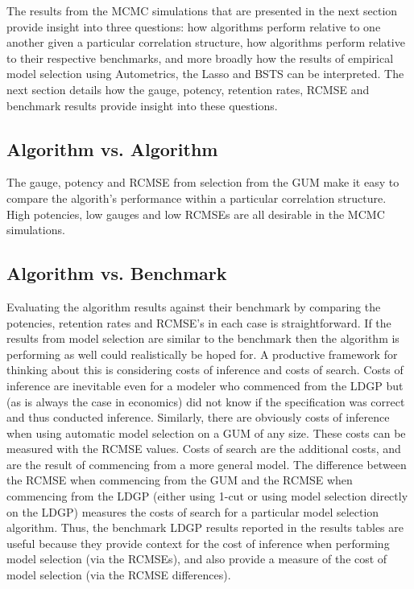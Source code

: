 \documentclass[11pt, oneside]{book}   	%
\begin{document}
The results from the MCMC simulations that are presented in the next section provide insight into three questions: how algorithms perform relative to one another given a particular correlation structure, how algorithms perform relative to their respective benchmarks, and more broadly how the results of empirical model selection using Autometrics, the Lasso and BSTS can be interpreted. The next section details how the gauge, potency, retention rates, RCMSE and benchmark results provide insight into these questions.

\subsection{Algorithm vs. Algorithm}

The gauge, potency and RCMSE from selection from the GUM make it easy to compare the algorith's performance within a particular correlation structure.  High potencies, low gauges and low RCMSEs are all desirable in the MCMC simulations. 

\subsection{Algorithm vs. Benchmark}

Evaluating the algorithm results against their benchmark by comparing the potencies, retention rates and RCMSE's in each case is straightforward. If the results from model selection are similar to the benchmark then the algorithm is performing as well could realistically be hoped for. A productive framework for thinking about this is considering costs of inference and costs of search. Costs of inference are inevitable even for a modeler who commenced from the LDGP but (as is always the case in economics) did not know if the specification was correct and thus conducted inference. Similarly, there are obviously costs of inference when using automatic model selection on a GUM of any size. These costs can be measured with the RCMSE values. Costs of search are the additional costs, and are the result of commencing from a more general model. The difference between the RCMSE when commencing from the GUM and the RCMSE when commencing from the LDGP (either using 1-cut or using model selection directly on the LDGP) measures the costs of search for a particular model selection algorithm. Thus, the benchmark LDGP results reported in the results tables are useful because they provide context for the cost of inference when performing model selection (via the RCMSEs), and also provide a measure of the cost of model selection (via the RCMSE differences).   
\end{document}
